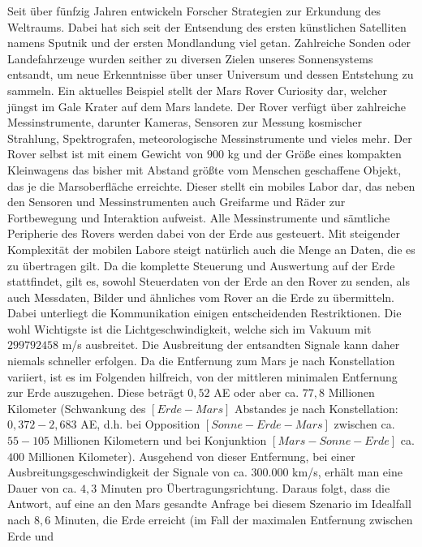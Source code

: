 Seit {\"u}ber f{\"u}nfzig Jahren entwickeln Forscher Strategien
zur Erkundung des Weltraums. Dabei hat sich seit der Entsendung des ersten k{\"u}nstlichen
Satelliten namens Sputnik und der ersten Mondlandung viel getan.
Zahlreiche Sonden oder Landefahrzeuge wurden seither zu diversen Zielen unseres
Sonnensystems entsandt, um neue Erkenntnisse {\"u}ber unser Universum und dessen
Entstehung zu sammeln. Ein aktuelles Beispiel stellt der Mars Rover Curiosity
dar, welcher j{\"u}ngst im Gale Krater auf dem Mars landete. Der Rover
verf{\"u}gt {\"u}ber zahlreiche Messinstrumente, darunter Kameras, Sensoren zur
Messung kosmischer Strahlung, Spektrografen, meteorologische Messinstrumente und
vieles mehr. Der Rover selbst ist mit einem Gewicht von $900$ kg und der
Gr{\"o}{\ss}e eines kompakten Kleinwagens das bisher mit Abstand gr{\"o}{\ss}te
vom Menschen geschaffene Objekt, das je die Marsoberfl{\"a}che erreichte.
Dieser stellt ein mobiles Labor dar, das neben den Sensoren und
Messinstrumenten auch Greifarme und R{\"a}der zur Fortbewegung und Interaktion
aufweist. Alle Messinstrumente und s{\"a}mtliche Peripherie des Rovers werden dabei von der
Erde aus gesteuert. Mit steigender Komplexit{\"a}t der mobilen Labore
steigt nat{\"u}rlich auch die Menge an Daten, die es zu {\"u}bertragen gilt. Da
die komplette Steuerung und Auswertung auf der Erde stattfindet, gilt es, sowohl
Steuerdaten von der Erde an den Rover zu senden, als auch Messdaten, Bilder und
{\"a}hnliches vom Rover an die Erde zu {\"u}bermitteln. Dabei unterliegt die
Kommunikation einigen entscheidenden Restriktionen. Die wohl Wichtigste ist die
Lichtgeschwindigkeit, welche sich im Vakuum mit $299 792 458$ m/s ausbreitet.
Die Ausbreitung der entsandten Signale kann daher niemals schneller erfolgen. Da die
Entfernung zum Mars je nach Konstellation variiert, ist es im Folgenden
hilfreich, von der mittleren minimalen Entfernung zur Erde auszugehen. Diese
betr{\"a}gt $0,52$ AE oder aber ca. $77,8$ Millionen Kilometer (Schwankung des
$[Erde - Mars]$ Abstandes je nach Konstellation: $0,372 - 2,683$ AE, d.h. bei
Opposition $[Sonne - Erde - Mars]$ zwischen ca. $55 - 105$ Millionen Kilometern
und bei Konjunktion $[Mars - Sonne - Erde]$ ca. $400$ Millionen Kilometer).
Ausgehend von dieser Entfernung, bei einer Ausbreitungsgeschwindigkeit der
Signale von ca. $300.000$ km/s, erh{\"a}lt man eine Dauer von ca. $4,3$ Minuten
pro {\"U}bertragungsrichtung. Daraus folgt, dass die Antwort, auf eine an den
Mars gesandte Anfrage bei diesem Szenario im Idealfall nach $8,6$
Minuten, die Erde erreicht (im Fall der maximalen Entfernung zwischen Erde und
